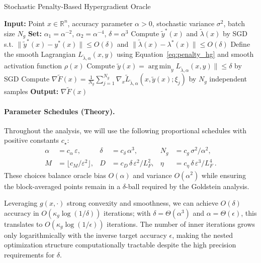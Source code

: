 \documentclass[letterpaper]{article} %
\DeclareMathOperator*{\argmin}{arg\,min}
\newcommand{\1}{\mathbf{1}}
\begin{document}
\begin{algorithm}[h!]
\caption{Stochastic Penalty-Based Hypergradient Oracle}
\label{alg:hypergradient_oracle}
\begin{algorithmic}[1]
\STATE \textbf{Input:} Point $x \in \mathbb{R}^n$, accuracy parameter $\alpha > 0$, stochastic variance $\sigma^2$, batch size $N_g$
\STATE \textbf{Set:} $\alpha_1 = \alpha^{-2}$, $\alpha_2 = \alpha^{-4}$, $\delta = \alpha^3$
\STATE Compute $\tilde{y}^*(x)$ and $\tilde{\lambda}(x)$ by SGD s.t. $\|\tilde{y}^*(x) - y^*(x)\| \leq O(\delta)$ and $\|\tilde{\lambda}(x) - \lambda^*(x)\| \leq O(\delta)$
\STATE Define the smooth Lagrangian $L_{\tilde{\lambda},\alpha}(x, y) $ using Equation~\ref{eq:penalty_hg} and smooth activation function $\rho(x)$ %
\STATE Compute $\tilde{y}(x) = \argmin_y L_{\tilde{\lambda},\alpha}(x, y)\| \leq \delta$ by SGD
\STATE Compute $\nabla\tilde{F}(x) = \frac{1}{N_g}\sum_{j=1}^{N_g} \nabla_x \tilde{L}_{\tilde{\lambda},\alpha}(x, \tilde{y}(x); \xi_j)$ by $N_g$ independent samples
\STATE \textbf{Output:} $\nabla\tilde{F}(x)$
\end{algorithmic}
\end{algorithm}

\paragraph{Parameter Schedules (Theory).}
Throughout the analysis, we will use the following proportional schedules with positive constants $c_\star$:
\begin{align*}
\alpha 
&= c_{\alpha}\, \varepsilon, 
&\delta 
&= c_{\delta} \, \alpha^{3}, 
&N_g 
&= c_{g}\, \sigma^{2}/\alpha^{2}, \\
M 
&= \big\lfloor c_{M}/\varepsilon^{2}\big\rfloor,
&D 
&= c_{D}\, \delta\, \varepsilon^{2}/L_{F}^{2},
&\eta
&= c_{\eta}\, \delta\, \varepsilon^{3}/L_{F}^{4}~.
\end{align*}
These choices balance oracle bias $O(\alpha)$ and variance $O(\alpha^{2})$ while ensuring the block-averaged points remain in a $\delta$-ball required by the Goldstein analysis.

\begin{remark}
 Leveraging $g(x,\cdot)$ strong convexity and smoothness, we can achieve $O(\delta)$ accuracy in $O(\kappa_g\log(1/\delta))$ iterations; with $\delta=\Theta(\alpha^3)$ and $\alpha=\Theta(\epsilon)$, this translates to $O(\kappa_g\log(1/\epsilon))$ iterations. The number of inner iterations grows only logarithmically with the inverse target accuracy $\epsilon$, making the nested optimization structure computationally tractable despite the high precision requirements for $\delta$.
\end{remark}
\end{document}
